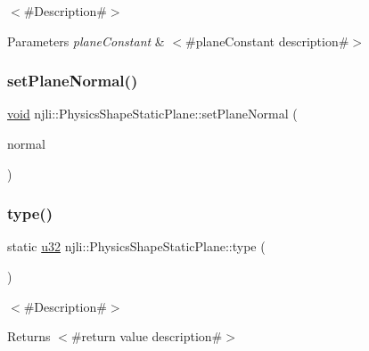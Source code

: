 $<$\#\+Description\#$>$


\begin{DoxyParams}{Parameters}
{\em plane\+Constant} & $<$\#plane\+Constant description\#$>$ \\
\hline
\end{DoxyParams}
\mbox{\label{classnjli_1_1_physics_shape_static_plane_a351f9c4734b51edef978bea4598d1c16}} 
\subsubsection{\texorpdfstring{set\+Plane\+Normal()}{setPlaneNormal()}}
{\footnotesize\ttfamily \mbox{\hyperlink{_thread_8h_af1e856da2e658414cb2456cb6f7ebc66}{void}} njli\+::\+Physics\+Shape\+Static\+Plane\+::set\+Plane\+Normal (\begin{DoxyParamCaption}\item[{const bt\+Vector3 \&}]{normal }\end{DoxyParamCaption})}

\mbox{\label{classnjli_1_1_physics_shape_static_plane_a5a914f2bd547a35665e382a77d04f058}} 
\subsubsection{\texorpdfstring{type()}{type()}}
{\footnotesize\ttfamily static \mbox{\hyperlink{_util_8h_a10e94b422ef0c20dcdec20d31a1f5049}{u32}} njli\+::\+Physics\+Shape\+Static\+Plane\+::type (\begin{DoxyParamCaption}{ }\end{DoxyParamCaption})\hspace{0.3cm}{\ttfamily [static]}}

$<$\#\+Description\#$>$

\begin{DoxyReturn}{Returns}
$<$\#return value description\#$>$ 
\end{DoxyReturn}


